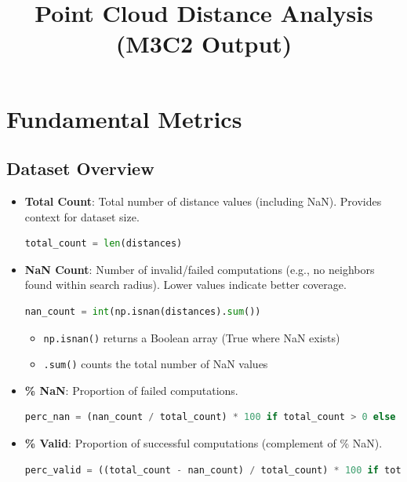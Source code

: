 \documentclass[12pt]{article}
\title{Point Cloud Distance Analysis (M3C2 Output)}
\author{}
\date{}
\begin{document}
\maketitle

\section{Fundamental Metrics}

\subsection{Dataset Overview}

\begin{itemize}
    \item \textbf{Total Count}: Total number of distance values (including NaN). Provides context for dataset size.
    \begin{lstlisting}[language=Python]
total_count = len(distances)
    \end{lstlisting}

    \item \textbf{NaN Count}: Number of invalid/failed computations (e.g., no neighbors found within search radius). Lower values indicate better coverage.
    \begin{lstlisting}[language=Python]
nan_count = int(np.isnan(distances).sum())
    \end{lstlisting}
    \begin{itemize}
        \item \texttt{np.isnan()} returns a Boolean array (True where NaN exists)
        \item \texttt{.sum()} counts the total number of NaN values
    \end{itemize}

    \item \textbf{\% NaN}: Proportion of failed computations.
    \begin{lstlisting}[language=Python]
perc_nan = (nan_count / total_count) * 100 if total_count > 0 else np.nan
    \end{lstlisting}

    \item \textbf{\% Valid}: Proportion of successful computations (complement of \% NaN).
    \begin{lstlisting}[language=Python]
perc_valid = ((total_count - nan_count) / total_count) * 100 if total_count > 0 else np.nan
    \end{lstlisting}


\end{itemize}
\end{document}
